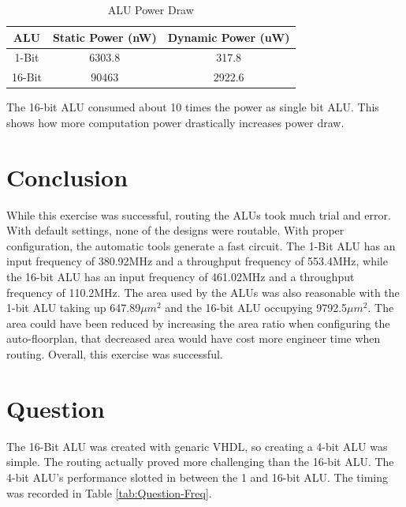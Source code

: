 \documentclass[11pt]{article}
\begin{document}
		\begin{table}[H]
			\centering
			\caption{ALU Power Draw}
			\label{tab:ALU-power}
			\begin{tabular}{|ccc|}
				\hline
				\textbf{ALU} & \textbf{Static Power (nW)} & \textbf{Dynamic Power (uW)} \\
				\hline
				1-Bit        & 6303.8                     & 317.8                       \\
				16-Bit       & 90463                      & 2922.6                      \\
				\hline
			\end{tabular}
		\end{table}
	
		The 16-bit ALU consumed about 10 times the power as single bit ALU. This shows how more computation power drastically increases power draw. 
			

\section{Conclusion}
	While this exercise was successful, routing the ALUs took much trial and error. With default settings, none of the designs were routable. With proper configuration, the automatic tools generate a fast circuit. The 1-Bit ALU has an input frequency of 380.92MHz and a throughput frequency of 553.4MHz, while the 16-bit ALU has an input frequency of 461.02MHz and a throughput frequency of 110.2MHz. The area used by the ALUs was also reasonable with the 1-bit ALU taking up 647.89$\mu m^2$ and the 16-bit ALU occupying 9792.5$\mu m^2$. The area could have been reduced by increasing the area ratio when configuring the auto-floorplan, that decreased area would have cost more engineer time when routing. Overall, this exercise was successful.

\section{Question}

	The 16-Bit ALU was created with genaric VHDL, so creating a 4-bit ALU was simple. The routing actually proved more challenging than the 16-bit ALU. The 4-bit ALU's performance slotted in between the 1 and 16-bit ALU. The timing was recorded in Table \ref{tab:Question-Freq}.
\end{document}
